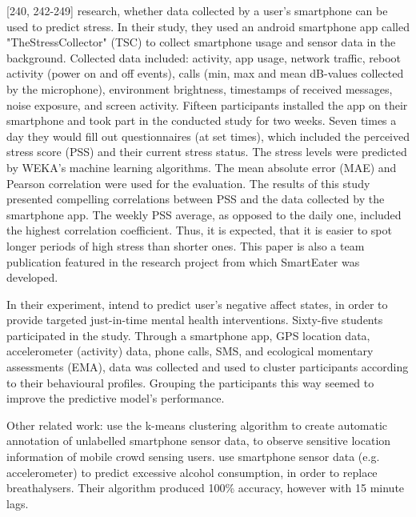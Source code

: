 \textcite{SmartphoneBasedStressPrediction2015}[240, 242-249] research, whether data collected by a user's smartphone can be used to predict stress. In their study, they used an android smartphone app called "TheStressCollector" (TSC) to collect smartphone usage and sensor data in the background. Collected data included: activity, app usage, network traffic, reboot activity (power on and off events), calls (min, max and mean dB-values collected by the microphone), environment brightness, timestamps of received messages, noise exposure, and screen activity. Fifteen participants installed the app on their smartphone and took part in the conducted study for two weeks. Seven times a day they would fill out questionnaires (at set times), which included the perceived stress score (PSS) and their current stress status. The stress levels were predicted by WEKA's machine learning algorithms. The mean absolute error (MAE) and Pearson correlation were used for the evaluation. The results of this study presented compelling correlations between PSS and the data collected by the smartphone app. The weekly PSS average, as opposed to the daily one, included the highest correlation coefficient. Thus, it is expected, that it is easier to spot longer periods of high stress than shorter ones. This paper is also a team publication featured in the research project from which SmartEater was developed.

In their experiment, \textcite{ClusterPassivelySensedData2018} intend to predict user's negative affect states, in order to provide targeted just-in-time mental health interventions. Sixty-five students participated in the study. Through a smartphone app, GPS location data, accelerometer (activity) data, phone calls, SMS, and ecological momentary assessments (EMA), data was collected and used to cluster participants according to their behavioural profiles. Grouping the participants this way seemed to improve the predictive model's performance.


Other related work: 
\textcite{pius2018automatic} use the k-means clustering algorithm to create automatic annotation of unlabelled smartphone sensor data, to observe sensitive location information of mobile crowd sensing users. \textcite{alcoholCravingPrediction} use smartphone sensor data (e.g. accelerometer) to predict excessive alcohol consumption, in order to replace breathalysers. Their algorithm produced 100\% accuracy, however with 15 minute lags.
